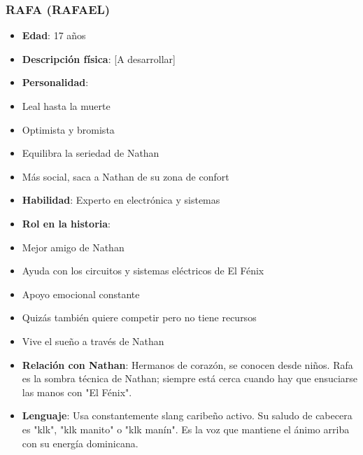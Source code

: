 \documentclass[11pt,a4paper]{report}
\begin{document}
\subsubsection{RAFA (RAFAEL)}
\begin{itemize}
  \item \textbf{Edad}: 17 años
  \item \textbf{Descripción física}: [A desarrollar]
  \item \textbf{Personalidad}: 
  \item Leal hasta la muerte
  \item Optimista y bromista
  \item Equilibra la seriedad de Nathan
  \item Más social, saca a Nathan de su zona de confort
  \item \textbf{Habilidad}: Experto en electrónica y sistemas
  \item \textbf{Rol en la historia}: 
  \item Mejor amigo de Nathan
  \item Ayuda con los circuitos y sistemas eléctricos de El Fénix
  \item Apoyo emocional constante
  \item Quizás también quiere competir pero no tiene recursos
  \item Vive el sueño a través de Nathan
  \item \textbf{Relación con Nathan}: Hermanos de corazón, se conocen desde niños. Rafa es la sombra técnica de Nathan; siempre está cerca cuando hay que ensuciarse las manos con "El Fénix".
  \item \textbf{Lenguaje}: Usa constantemente slang caribeño activo. Su saludo de cabecera es "klk", "klk manito" o "klk manín". Es la voz que mantiene el ánimo arriba con su energía dominicana.

\end{itemize}
\end{document}
